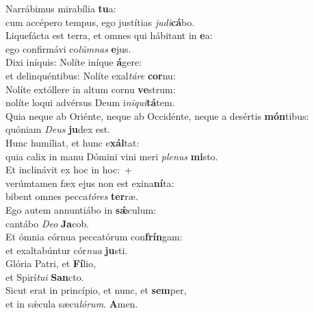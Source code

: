 \evenverse Narrábimus mirabília \textbf{tu}a:~\*\\
\evenverse cum accépero tempus, ego justítias \textit{ju}\textit{di}\textbf{cá}bo.\\
\oddverse Liquefácta est terra, et omnes qui hábitant in \textbf{e}a:~\*\\
\oddverse ego confirmávi co\textit{lúm}\textit{nas} \textbf{e}jus.\\
\evenverse Dixi iníquis: Nolíte iníque \textbf{á}gere:~\*\\
\evenverse et delinquéntibus: Nolíte exal\textit{tá}\textit{re} \textbf{cor}nu:\\
\oddverse Nolíte extóllere in altum cornu \textbf{ve}strum:~\*\\
\oddverse nolíte loqui advérsus Deum i\textit{ni}\textit{qui}\textbf{tá}tem.\\
\evenverse Quia neque ab Oriénte, neque ab Occidénte, neque a desértis \textbf{món}tibus:~\*\\
\evenverse quóniam \textit{De}\textit{us} \textbf{ju}dex est.\\
\oddverse Hunc humíliat, et hunc e\textbf{xál}tat:~\*\\
\oddverse quia calix in manu Dómini vini meri \textit{ple}\textit{nus} \textbf{mi}sto.\\
\evenverse Et inclinávit ex hoc in hoc:~+\\
\evenverse  verúmtamen fæx ejus non est exina\textbf{ní}ta:~\*\\
\evenverse bibent omnes pecca\textit{tó}\textit{res} \textbf{ter}ræ.\\
\oddverse Ego autem annuntiábo in \textbf{sǽ}culum:~\*\\
\oddverse cantábo \textit{De}\textit{o} \textbf{Ja}cob.\\
\evenverse Et ómnia córnua peccatórum con\textbf{frín}gam:~\*\\
\evenverse et exaltabúntur cór\textit{nu}\textit{a} \textbf{ju}sti.\\
\oddverse Glória Patri, et \textbf{Fí}lio,~\*\\
\oddverse et Spirí\textit{tu}\textit{i} \textbf{San}cto.\\
\evenverse Sicut erat in princípio, et nunc, et \textbf{sem}per,~\*\\
\evenverse et in sǽcula sæcu\textit{ló}\textit{rum}. \textbf{A}men.\\
